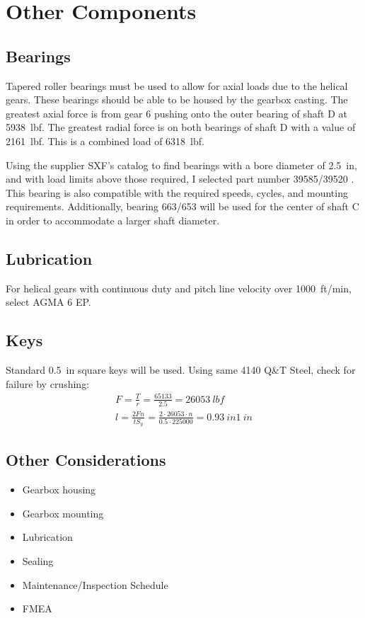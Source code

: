 \documentclass[titlepage]{article} %
\begin{document}
\section{Other Components}
\subsection{Bearings}
Tapered roller bearings must be used to allow for axial loads due to the helical
gears. These bearings should be able to be housed by the gearbox casting. The
greatest axial force is from gear 6 pushing onto the outer bearing of shaft D at
\SI{5938}{lbf}. The greatest radial force is on both bearings of shaft D with a
value of \SI{2161}{lbf}. This is a combined load of \SI{6318}{lbf}.

Using the supplier SXF's catalog to find bearings with a bore diameter of
\SI{2.5}{in}, and with load limits above those required, I selected part number
39585/39520 \cite{sxfbearing}. This bearing is also compatible with the required
speeds, cycles, and mounting requirements. Additionally, bearing 663/653 will be
used for the center of shaft C in order to accommodate a larger shaft diameter.

\subsection{Lubrication}
For helical gears with continuous duty and pitch line velocity over
\SI{1000}{ft/min}, select AGMA 6 EP.

\subsection{Keys}
Standard \SI{0.5}{in} square keys will be used. Using same  4140 Q\&T Steel,
check for failure by crushing:
\begin{gather*}
    F = \frac{T}{r} = \frac{65133}{2.5} = \SI{26053}{lbf}\\
    l = \frac{2 F n}{t S_y} = \frac{2 \cdot 26053 \cdot n}{0.5 \cdot 225000} = \SI{0.93}{in} \SI{1}{in}
\end{gather*}

\subsection{Other Considerations}
\begin{itemize}
    \item Gearbox housing
    \item Gearbox mounting
    \item Lubrication
    \item Sealing
    \item Maintenance/Inspection Schedule
    \item FMEA 
\end{itemize}
\end{document}
